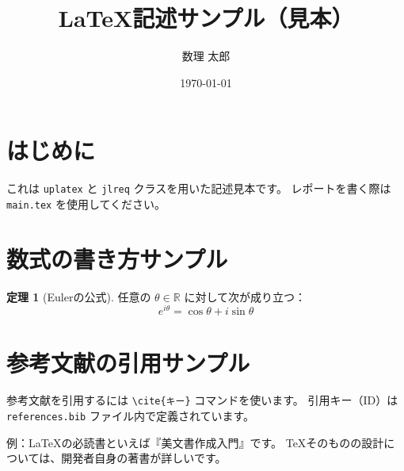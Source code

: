 \documentclass[uplatex,dvipdfmx]{jlreq}
\title{LaTeX記述サンプル（見本）}
\author{数理 太郎}
\date{\today}
\theoremstyle{definition}
\newtheorem{theorem}{定理}[section]
\begin{document}
\maketitle

\section{はじめに}
これは \texttt{uplatex} と \texttt{jlreq} クラスを用いた記述見本です。
レポートを書く際は \texttt{main.tex} を使用してください。

\section{数式の書き方サンプル}
\begin{theorem}[Eulerの公式]
任意の $\theta \in \mathbb{R}$ に対して次が成り立つ：
\begin{equation}
    e^{i\theta} = \cos\theta + i\sin\theta
\end{equation}
\end{theorem}

\section{参考文献の引用サンプル}
参考文献を引用するには \texttt{\textbackslash cite\{キー\}} コマンドを使います。
引用キー（ID）は \texttt{references.bib} ファイル内で定義されています。

例：LaTeXの必読書といえば『美文書作成入門』\cite{okumura2023}です。
TeXそのものの設計については、開発者自身の著書\cite{knuth84}が詳しいです。


\end{document}
